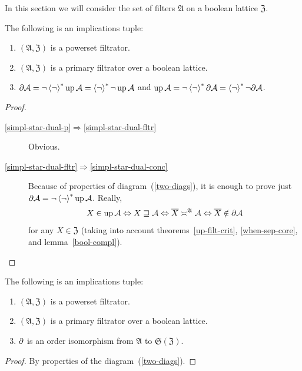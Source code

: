 In this section we will consider the set of filters $\mathfrak{A}$
on a boolean lattice $\mathfrak{Z}$.
\begin{thm}
\label{f-simpl-star-dual}The following is an implications tuple:
\begin{enumerate}
\item \label{simpl-star-dual-p}$(\mathfrak{A},\mathfrak{Z})$ is a powerset
filtrator.
\item \label{simpl-star-dual-fltr}$(\mathfrak{A},\mathfrak{Z})$ is a primary
filtrator over a boolean lattice.
\item \label{simpl-star-dual-conc}$\partial\mathcal{A}=\lnot\left\langle \lnot\right\rangle ^{\ast}\operatorname{up}\mathcal{A}=\left\langle \lnot\right\rangle ^{\ast}\lnot\operatorname{up}\mathcal{A}$
and $\operatorname{up}\mathcal{A}=\lnot\left\langle \lnot\right\rangle ^{\ast}\partial\mathcal{A}=\left\langle \lnot\right\rangle ^{\ast}\lnot\partial\mathcal{A}$.
\end{enumerate}
\end{thm}
\begin{proof}
~
\begin{description}
\item [{\ref{simpl-star-dual-p}$\Rightarrow$\ref{simpl-star-dual-fltr}}] Obvious.
\item [{\ref{simpl-star-dual-fltr}$\Rightarrow$\ref{simpl-star-dual-conc}}] Because
of properties of diagram~(\ref{two-diags}), it is enough to prove
just $\partial\mathcal{A}=\lnot\left\langle \lnot\right\rangle ^{\ast}\operatorname{up}\mathcal{A}$. Really,
\[X\in\operatorname{up}\mathcal{A}\Leftrightarrow X\sqsupseteq\mathcal{A}\Leftrightarrow\overline{X}\asymp^{\mathfrak{A}}\mathcal{A}\Leftrightarrow\overline{X}\notin\partial\mathcal{A}\]
for any $X\in\mathfrak{Z}$ (taking into account theorems~\ref{up-filt-crit},
\ref{when-sep-core}, and lemma~\ref{bool-compl}).
\end{description}
\end{proof}
\begin{cor}
\label{d-inj}The following is an implications tuple:
\begin{enumerate}
\item $(\mathfrak{A},\mathfrak{Z})$ is a powerset filtrator.
\item $(\mathfrak{A},\mathfrak{Z})$ is a primary filtrator over a boolean
lattice.
\item $\partial$ is an order isomorphism from $\mathfrak{A}$ to $\mathfrak{S}(\mathfrak{Z})$.
\end{enumerate}
\end{cor}
\begin{proof}
By properties of the diagram~(\ref{two-diags}).\end{proof}
